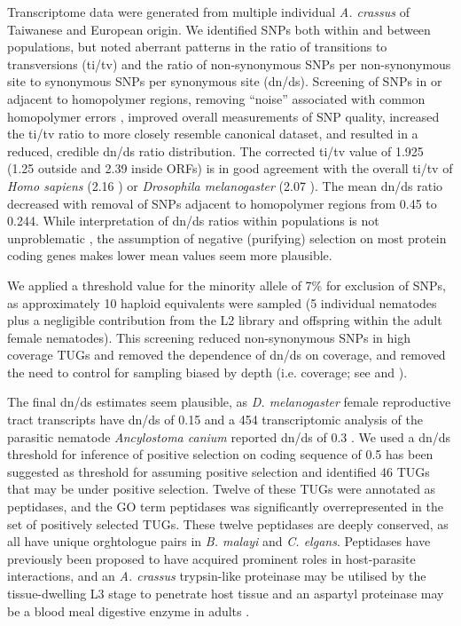 \documentclass[10pt]{bmc_article}
\newenvironment{bmcformat}{\begin{raggedright}\baselineskip20pt\sloppy\setboolean{publ}{false}}{\end{raggedright}\baselineskip20pt\sloppy}
\begin{document}
\begin{bmcformat}
Transcriptome data were generated from multiple individual
\textit{A. crassus} of Taiwanese and European origin. We identified
SNPs both within and between populations, but noted aberrant patterns
in the ratio of transitions to transversions (ti/tv) and the ratio of
non-synonymous SNPs per non-synonymous site to synonymous SNPs per
synonymous site (dn/ds). Screening of SNPs in or adjacent to
homopolymer regions, removing “noise'' associated with common
homopolymer errors \cite{pmid21685085}, improved overall measurements
of SNP quality, increased the ti/tv ratio to more closely resemble
canonical dataset, and resulted in a reduced, credible dn/ds ratio
distribution. The corrected ti/tv value of 1.925 (1.25 outside and
2.39 inside ORFs) is in good agreement with the overall ti/tv of
\textit{Homo sapiens} (2.16 \cite{pmid21169219}) or \textit{Drosophila
  melanogaster} (2.07 \cite{pmid21143862}). The mean dn/ds ratio
decreased with removal of SNPs adjacent to homopolymer regions from
0.45 to 0.244. While interpretation of dn/ds ratios within populations
is not unproblematic \cite{pmid19081788}, the assumption of negative
(purifying) selection on most protein coding genes makes lower mean
values seem more plausible.


We applied a threshold value for the minority allele of 7\% for
exclusion of SNPs, as approximately 10 haploid equivalents were
sampled (5 individual nematodes plus a negligible contribution from
the L2 library and offspring within the adult female nematodes). This
screening reduced non-synonymous SNPs in high coverage TUGs and
removed the dependence of dn/ds on coverage, and removed the need to
control for sampling biased by depth (i.e. coverage; see
\cite{pmid18590545} and \cite{pmid20478048}).

The final dn/ds estimates seem plausible, as \textit{D. melanogaster}
female reproductive tract transcripts have dn/ds of 0.15
\cite{pmid15579698} and a 454 transcriptomic analysis of the parasitic
nematode \textit{Ancylostoma canium} reported dn/ds of 0.3
\cite{pmid20470405}. We used a dn/ds threshold for inference of
positive selection on coding sequence of 0.5 has been suggested as
threshold for assuming positive selection \cite{pmid15579698} and
identified 46 TUGs that may be under positive selection. Twelve of
these TUGs were annotated as peptidases, and the GO term peptidases
was significantly overrepresented in the set of positively selected
TUGs. These twelve peptidases are deeply conserved, as all have unique
orghtologue pairs in \textit{B. malayi} and
\textit{C. elgans}. Peptidases have previously been proposed to have
acquired prominent roles in host-parasite interactions, and an
\textit{A. crassus} trypsin-like proteinase may be utilised by the
tissue-dwelling L3 stage to penetrate host tissue and an aspartyl
proteinase may be a blood meal digestive enzyme in adults
\cite{polzer_identification_1993}.  


\end{bmcformat}
\end{document}
